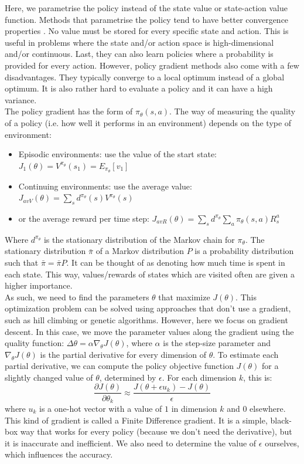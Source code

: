 \documentclass[a4paper]{article}
\begin{document}
Here, we parametrise the policy instead of the state value or state-action value function.
Methods that parametrise the policy tend to have better convergence properties \citep{Sutton1999PolicyApproximation}.
No value must be stored for every specific state and action. This is useful in problems where the state and/or action space is high-dimensional and/or continuous. Last, they can also learn policies where a probability is provided for every action.
However, policy gradient methods also come with a few disadvantages. They typically converge to a local optimum instead of a global optimum. It is also rather hard to evaluate a policy and it can have a high variance.\\
The policy gradient has the form of $\pi_{\theta}(s,a)$. The way of measuring the quality of a policy (i.e. how well it performs in an environment) depends on the type of environment:
\begin{itemize}
\item Episodic environments: use the value of the start state: $J_1(\theta) = V^{\pi_{\theta}}(s_1) = E_{\pi_{\theta}} [v_1]$
\item Continuing environments: use the average value: $J_{avV}(\theta) = \sum_s d^{\pi_{\theta}}(s)V^{\pi_{\theta}}(s)$
\item or the average reward per time step: $J_{avR}(\theta) = \sum_s d^{\pi_{\theta}} \sum_a \pi_{\theta}(s,a) R_s^a$
\end{itemize}
Where $d^{\pi_{\theta}}$ is the stationary distribution of the Markov chain for $\pi_{\theta}$. The stationary distribution $\bar{\pi}$ of a Markov distribution $P$ is a probability distribution such that $\bar{\pi} = \bar{\pi} P$. It can be thought of as denoting how much time is spent in each state. This way, values/rewards of states which are visited often are given a higher importance.\\
As such, we need to find the parameters $\theta$ that maximize $J(\theta)$. This optimization problem can be solved using approaches that don't use a gradient, such as hill climbing or genetic algorithms. However, here we focus on gradient descent. In this case, we move the parameter values along the gradient using the quality function: $\Delta \theta = \alpha \nabla_{\theta} J(\theta)$, where $\alpha$ is the step-size parameter and $\nabla_{\theta} J(\theta)$ is the partial derivative for every dimension of $\theta$. To estimate each partial derivative, we can compute the policy objective function $J(\theta)$ for a slightly changed value of $\theta$, determined by $\epsilon$. For each dimension $k$, this is:
\begin{equation}
\frac{\partial J(\theta)}{\partial \theta_k} \approx \frac{J(\theta + \epsilon u_k) - J(\theta)}{\epsilon}
\end{equation}
where $u_k$ is a one-hot vector with a value of $1$ in dimension $k$ and $0$ elsewhere. This kind of gradient is called a Finite Difference gradient. It is a simple, black-box way that works for every policy (because we don't need the derivative), but it is inaccurate and inefficient. We also need to determine the value of $\epsilon$ ourselves, which influences the accuracy.\\
\end{document}
